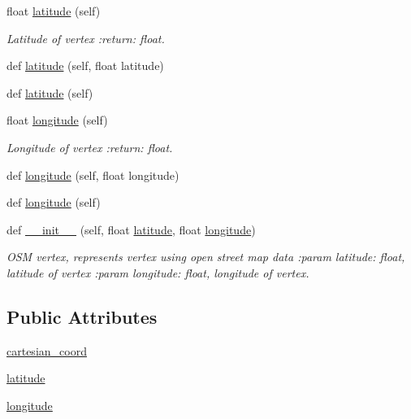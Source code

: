 \begin{DoxyCompactItemize}
\item 
float \mbox{\hyperlink{classbridges_1_1data__src__dependent_1_1osm_1_1_osm_vertex_af84ed314a3dfab4367d1a3cf9f4ae8e4}{latitude}} (self)
\begin{DoxyCompactList}\small\item\em Latitude of vertex \+:return\+: float. \end{DoxyCompactList}\item 
def \mbox{\hyperlink{classbridges_1_1data__src__dependent_1_1osm_1_1_osm_vertex_a3b232fb01e646be64cbea3f7c95f8945}{latitude}} (self, float latitude)
\item 
def \mbox{\hyperlink{classbridges_1_1data__src__dependent_1_1osm_1_1_osm_vertex_a31eefda235d8c4dd065ee5200897b473}{latitude}} (self)
\item 
float \mbox{\hyperlink{classbridges_1_1data__src__dependent_1_1osm_1_1_osm_vertex_a0abaf863c1480ab953fc7895292449be}{longitude}} (self)
\begin{DoxyCompactList}\small\item\em Longitude of vertex \+:return\+: float. \end{DoxyCompactList}\item 
def \mbox{\hyperlink{classbridges_1_1data__src__dependent_1_1osm_1_1_osm_vertex_a2bb7522f359d6d2a87d5d69422b712eb}{longitude}} (self, float longitude)
\item 
def \mbox{\hyperlink{classbridges_1_1data__src__dependent_1_1osm_1_1_osm_vertex_aca0aff0932e5436a0f72e53a93fe8f42}{longitude}} (self)
\item 
def \mbox{\hyperlink{classbridges_1_1data__src__dependent_1_1osm_1_1_osm_vertex_a638bc812da9e82085a8692f57468b95e}{\+\_\+\+\_\+init\+\_\+\+\_\+}} (self, float \mbox{\hyperlink{classbridges_1_1data__src__dependent_1_1osm_1_1_osm_vertex_a2b346821c6310d148977b1b6212c4c59}{latitude}}, float \mbox{\hyperlink{classbridges_1_1data__src__dependent_1_1osm_1_1_osm_vertex_a0dd0da0c52e3ca388cf8fbe5f613c273}{longitude}})
\begin{DoxyCompactList}\small\item\em O\+SM vertex, represents vertex using open street map data \+:param latitude\+: float, latitude of vertex \+:param longitude\+: float, longitude of vertex. \end{DoxyCompactList}\end{DoxyCompactItemize}
\subsection*{Public Attributes}
\begin{DoxyCompactItemize}
\item 
\mbox{\hyperlink{classbridges_1_1data__src__dependent_1_1osm_1_1_osm_vertex_a5f7c71b790312e337d344a311d5b0fae}{cartesian\+\_\+coord}}
\item 
\mbox{\hyperlink{classbridges_1_1data__src__dependent_1_1osm_1_1_osm_vertex_a2b346821c6310d148977b1b6212c4c59}{latitude}}
\item 
\mbox{\hyperlink{classbridges_1_1data__src__dependent_1_1osm_1_1_osm_vertex_a0dd0da0c52e3ca388cf8fbe5f613c273}{longitude}}
\end{DoxyCompactItemize}


